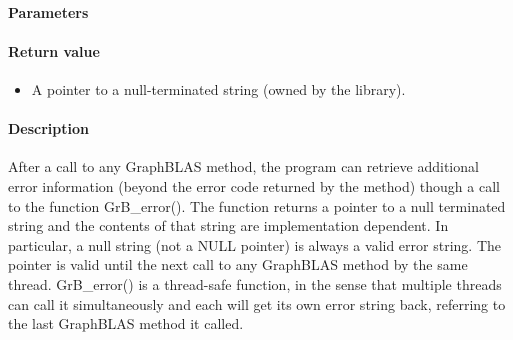 \paragraph{Parameters}

\paragraph{Return value}
\begin{itemize}[leftmargin=2.1in]
	\item A pointer to a null-terminated string (owned by the library).
\end{itemize}

\paragraph{Description}


After a call to any GraphBLAS method, the program can retrieve additional
error information (beyond the error code returned by the method) though a
call to the function {\sf GrB\_error()}. 
The function returns a pointer to a null terminated string and the contents of that string
are implementation dependent. In particular, a null string (not a {\sf NULL} pointer) is always a valid error string.
The pointer is valid until the next call to any GraphBLAS method by the same thread.
{\sf GrB\_error()} is a thread-safe function, in the sense that multiple threads can
call it simultaneously and each will get its own error string back, referring to the
last GraphBLAS method it called.

